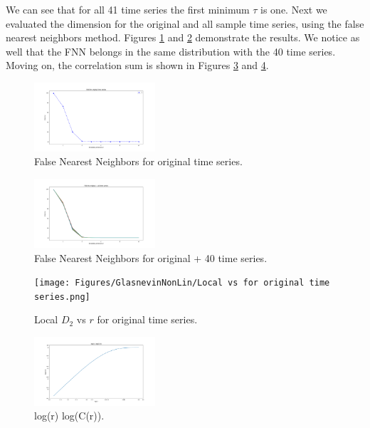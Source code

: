 \documentclass[conference]{IEEEtran}
\begin{document}
We can see that for all 41 time series the first minimum $\tau$ is one. Next we evaluated the dimension for the original and all sample time series, using the false nearest neighbors method. Figures \ref{dimg} and \ref{dimallg} demonstrate the results. We notice as well that the FNN belongs in the same distribution with the 40 time series. Moving on, the correlation sum is shown in Figures \ref{corsumg} and \ref{corlogg}.
\vspace{80mm}

\begin{figure}[ht]
    \centering
    \includegraphics[width=0.40\textwidth]{Figures/GlasnevinNonLin/FNN for original time series.png}
    \caption{False Nearest Neighbors for original time series.}
    \label{dimg}
\end{figure}

\begin{figure}[ht]
    \centering
    \includegraphics[width=0.40\textwidth]{Figures/GlasnevinNonLin/FNN for original + 40 time series.png}
    \caption{False Nearest Neighbors for original + 40 time series.}
    \label{dimallg}
\end{figure}

\begin{figure}[ht]
    \centering
    \texttt{[image: Figures/GlasnevinNonLin/Local vs for original time series.png]}
    \caption{Local $D_2$ vs $r$ for original time series.}
    \label{corsumg}
\end{figure}
\vspace{80mm}

\begin{figure}[ht]
    \centering
    \includegraphics[width=0.40\textwidth]{Figures/GlasnevinNonLin/log(r), log(C(r)).png}
    \caption{log(r) log(C(r)).}
    \label{corlogg}
\end{figure}
\end{document}
